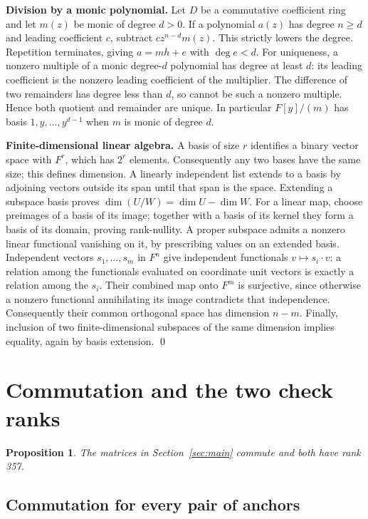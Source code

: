 \documentclass{article}
\newtheorem{proposition}{Proposition}
\begin{document}
\textbf{Division by a monic polynomial.} Let \(D\) be a commutative coefficient ring and let
\(m(z)\) be monic of degree \(d > 0\). If a polynomial \(a(z)\) has degree \(n \ge d\) and leading
coefficient \(c\), subtract \(c z^{n-d} m(z)\). This strictly lowers the degree. Repetition
terminates, giving \(a = mh + e\) with \(\deg e < d\). For uniqueness, a nonzero multiple of a
monic degree-\(d\) polynomial has degree at least \(d\): its leading coefficient is the nonzero
leading coefficient of the multiplier. The difference of two remainders has degree less than
\(d\), so cannot be such a nonzero multiple. Hence both quotient and remainder are unique. In
particular \(F[y]/(m)\) has basis \(1, y, \dots, y^{d-1}\) when \(m\) is monic of degree \(d\).

\textbf{Finite-dimensional linear algebra.} A basis of size \(r\) identifies a binary vector
space with \(F^r\), which has \(2^r\) elements. Consequently any two bases have the same size;
this defines dimension. A linearly independent list extends to a basis by adjoining vectors
outside its span until that span is the space. Extending a subspace basis proves
\(\dim(U/W) = \dim U - \dim W\). For a linear map, choose preimages of a basis of its image;
together with a basis of its kernel they form a basis of its domain, proving rank-nullity. A
proper subspace admits a nonzero linear functional vanishing on it, by prescribing values on an
extended basis. Independent vectors \(s_1, \dots, s_m\) in \(F^n\) give independent functionals
\(v \mapsto s_i \cdot v\): a relation among the functionals evaluated on coordinate unit vectors
is exactly a relation among the \(s_i\). Their combined map onto \(F^m\) is surjective, since
otherwise a nonzero functional annihilating its image contradicts that independence.
Consequently their common orthogonal space has dimension \(n - m\). Finally, inclusion of two
finite-dimensional subspaces of the same dimension implies equality, again by basis
extension. \qed

\section{Commutation and the two check ranks}\label{sec:ranks}

\begin{proposition}\label{prop:ranks}
  The matrices in Section~\ref{sec:main} commute and both have rank 357.
\end{proposition}

\subsection{Commutation for every pair of anchors}\label{sec:commutation}
\end{document}
